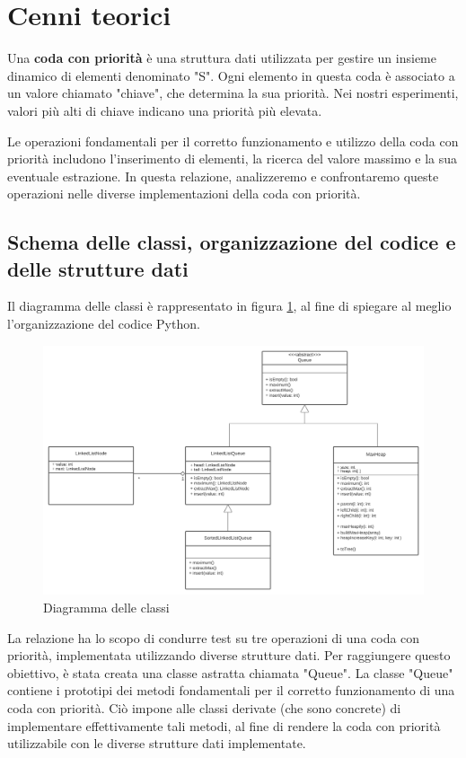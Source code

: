 \documentclass{article}
\begin{document}
\clearpage

\section{Cenni teorici}
Una \textbf{coda con priorità} è una struttura dati utilizzata per gestire un insieme dinamico di elementi denominato "S". Ogni elemento in questa coda è associato a un valore chiamato "chiave", che determina la sua priorità. Nei nostri esperimenti, valori più alti di chiave indicano una priorità più elevata.

Le operazioni fondamentali per il corretto funzionamento e utilizzo della coda con priorità includono l'inserimento di elementi, la ricerca del valore massimo e la sua eventuale estrazione. In questa relazione, analizzeremo e confrontaremo queste operazioni nelle diverse implementazioni della coda con priorità.

\subsection{Schema delle classi, organizzazione del codice e delle strutture dati}
Il diagramma delle classi è rappresentato in figura \ref{fig: DiagrammaDelleClassi}, al fine di spiegare al meglio l'organizzazione del codice Python. 

\begin{figure}[h]
    \includegraphics[width=1\textwidth]{Images/DiagrammaDelleClassi.png}
    \centering
    \caption{Diagramma delle classi}
    \label{fig: DiagrammaDelleClassi}
\end{figure}

La relazione ha lo scopo di condurre test su tre operazioni di una coda con priorità, implementata utilizzando diverse strutture dati. Per raggiungere questo obiettivo, è stata creata una classe astratta chiamata "Queue". La classe "Queue" contiene i prototipi dei metodi fondamentali per il corretto funzionamento di una coda con priorità. Ciò impone alle classi derivate (che sono concrete) di implementare effettivamente tali metodi, al fine di rendere la coda con priorità utilizzabile con le diverse strutture dati implementate.
\end{document}

